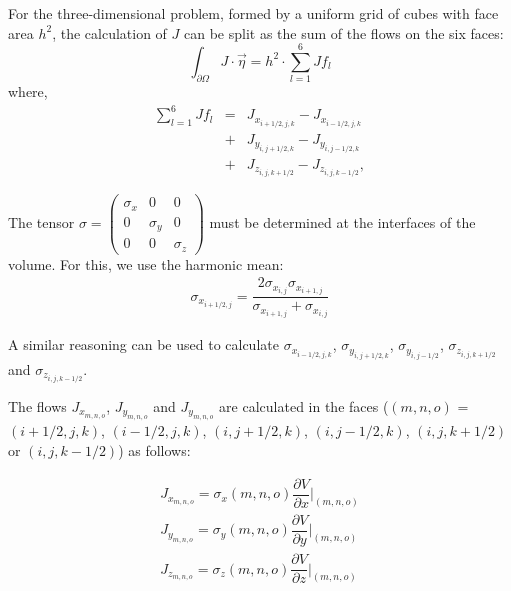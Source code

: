 For the three-dimensional problem, formed by a uniform grid of cubes with
face area $h^2$, the calculation of $J$ can be split as the sum of the flows
on the six faces:
\begin{equation}
          \int_{\partial \Omega} J \cdot \vec{\eta} = h^2 \cdot \displaystyle
          \sum_{l=1}^{6}{{Jf}_l}
     \label{eq:flux}
\end{equation}
where,
\begin{eqnarray}
  \sum_{l=1}^{6}{{Jf}_l} &=& J_{x_{i+1/2,j,k}} - J_{x_{i-1/2,j,k}} \nonumber \\
                      &+& J_{y_{i,j+1/2,k}} - J_{y_{i,j-1/2,k}} \\
                      &+& J_{z_{i,j, k+1/2}} - J_{z_{i,j, k-1/2}} \nonumber,
\end{eqnarray}

The tensor $\sigma = \left(\begin{array}{ccc} \sigma_x & 0 & 0 \\ 0 & \sigma_y &
0 \\ 0 & 0 & \sigma_z \end{array} \right)$ must be determined at the interfaces
of the volume. For this, we use the harmonic mean:
\begin{eqnarray}
    \sigma_{x_{i+1/2, j}} = \displaystyle \dfrac{2\sigma_{x_{i,j}}\sigma_{x_{i+1,j}}}{\sigma_{x_{i+1, j}}+\sigma_{x_{i,j}}}
\end{eqnarray}

A similar reasoning can be used to calculate $\sigma_{x_{i-1/2, j,
k}}$, $\sigma_{y_{i, j+1/2, k}}$, $\sigma_{y_{i, j-1/2}}$, $\sigma_{z_{i, j,
k+1/2}}$ and $\sigma_{z_{i, j, k-1/2}}$.

The flows $J_{x_{m,n,o}}$, $J_{y_{m,n,o}}$ and $J_{y_{m,n,o}}$ are calculated in the
faces ($(m,n,o)$ = $(i+1/2,j,k)$, $(i-1/2,j,k)$, $(i,j+1/2,k)$, $(i,j-1/2,k)$,
$(i,j,k+1/2)$ or $(i,j,k-1/2)$) as follows:

\begin{eqnarray}
    J_{x_{m,n,o}} = \sigma_x(m,n,o) \dfrac{\partial V}{\partial x} \bigg|_{(m,n,o)}\\
    J_{y_{m,n,o}} = \sigma_{y}(m,n,o) \dfrac{\partial V}{\partial y} \bigg|_{(m,n,o)}\\
    J_{z_{m,n,o}} = \sigma_{z}(m,n,o) \dfrac{\partial V}{\partial z} \bigg|_{(m,n,o)}
\end{eqnarray}

